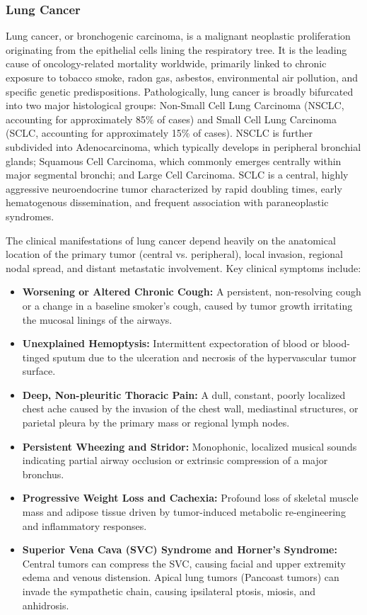 \subsubsection{Lung Cancer}

Lung cancer, or bronchogenic carcinoma, is a malignant neoplastic proliferation originating from the epithelial cells lining the respiratory tree. It is the leading cause of oncology-related mortality worldwide, primarily linked to chronic exposure to tobacco smoke, radon gas, asbestos, environmental air pollution, and specific genetic predispositions. Pathologically, lung cancer is broadly bifurcated into two major histological groups: Non-Small Cell Lung Carcinoma (NSCLC, accounting for approximately 85\% of cases) and Small Cell Lung Carcinoma (SCLC, accounting for approximately 15\% of cases). NSCLC is further subdivided into Adenocarcinoma, which typically develops in peripheral bronchial glands; Squamous Cell Carcinoma, which commonly emerges centrally within major segmental bronchi; and Large Cell Carcinoma. SCLC is a central, highly aggressive neuroendocrine tumor characterized by rapid doubling times, early hematogenous dissemination, and frequent association with paraneoplastic syndromes.

The clinical manifestations of lung cancer depend heavily on the anatomical location of the primary tumor (central vs. peripheral), local invasion, regional nodal spread, and distant metastatic involvement. Key clinical symptoms include:

\begin{itemize}
	\item \textbf{Worsening or Altered Chronic Cough:} A persistent, non-resolving cough or a change in a baseline smoker's cough, caused by tumor growth irritating the mucosal linings of the airways.
	\item \textbf{Unexplained Hemoptysis:} Intermittent expectoration of blood or blood-tinged sputum due to the ulceration and necrosis of the hypervascular tumor surface.
	\item \textbf{Deep, Non-pleuritic Thoracic Pain:} A dull, constant, poorly localized chest ache caused by the invasion of the chest wall, mediastinal structures, or parietal pleura by the primary mass or regional lymph nodes.
	\item \textbf{Persistent Wheezing and Stridor:} Monophonic, localized musical sounds indicating partial airway occlusion or extrinsic compression of a major bronchus.
	\item \textbf{Progressive Weight Loss and Cachexia:} Profound loss of skeletal muscle mass and adipose tissue driven by tumor-induced metabolic re-engineering and inflammatory responses.
	\item \textbf{Superior Vena Cava (SVC) Syndrome and Horner's Syndrome:} Central tumors can compress the SVC, causing facial and upper extremity edema and venous distension. Apical lung tumors (Pancoast tumors) can invade the sympathetic chain, causing ipsilateral ptosis, miosis, and anhidrosis.
\end{itemize}

